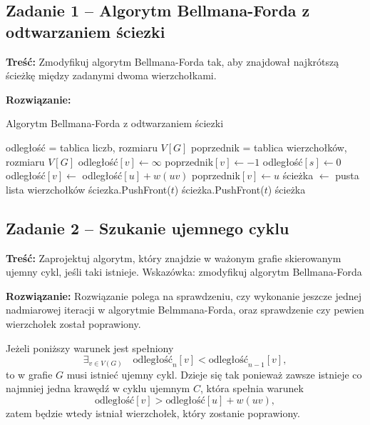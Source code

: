 \subsection{Zadanie 1 -- Algorytm Bellmana-Forda z odtwarzaniem ściezki}
\textbf{Treść: }Zmodyfikuj algorytm Bellmana-Forda tak, 
aby znajdował najkrótszą ścieżkę między zadanymi dwoma
wierzchołkami.

\textbf{Rozwiązanie: }

\begin{algorithm}[H]
	\caption{Algorytm Bellmana-Forda z odtwarzaniem ściezki}
	\begin{algorithmic}[1]
		\State odległość = tablica liczb, rozmiaru $V[G]$
		\State poprzednik = tablica wierzchołków, rozmiaru $V[G]$
		\State odległość$[v]\gets\infty$
		\State poprzednik$[v]\gets-1$
		\EndFor
		\State odległość$[s]\gets0$
		\State odległość$[v]\gets$ odległość$[u] + w(uv)$ 
		\State poprzednik$[v]\gets u$
		\EndIf
		\EndFor
		\EndFor
		\State ścieżka $\gets$ pusta lista wierzchołków
		\State ściezka.PushFront($t$)
		\State ścieżka.PushFront($t$)
		\EndWhile
		\State \Return ścieżka
		\EndProcedure
	\end{algorithmic}
	\label{Zadanie31}
\end{algorithm}
\subsection{Zadanie 2 -- Szukanie ujemnego cyklu}
\textbf{Treść: } Zaprojektuj algorytm, który znajdzie w 
ważonym grafie skierowanym ujemny cykl, jeśli taki istnieje.
Wskazówka: zmodyfikuj algorytm Bellmana-Forda

\textbf{Rozwiązanie: }
Rozwiązanie polega na sprawdzeniu, czy wykonanie
jeszcze jednej nadmiarowej iteracji 
w algorytmie Belmmana-Forda, oraz sprawdzenie
czy pewien wierzchołek został poprawiony.

Jeżeli poniższy warunek jest spełniony
\[\exists_{v\in V(G)}\quad \text{odległość}_n[v] < \text{odległość}_{n-1}[v],\]
to w grafie $G$ musi istnieć ujemny cykl. Dzieje się 
tak ponieważ zawsze istnieje co najmniej jedna krawędź 
w cyklu ujemnym $C$, która spełnia warunek 
\[\text{odległość}[v] > \text{odległość}[u] + w(uv),\]
zatem będzie wtedy istniał wierzchołek, który zostanie 
poprawiony.

